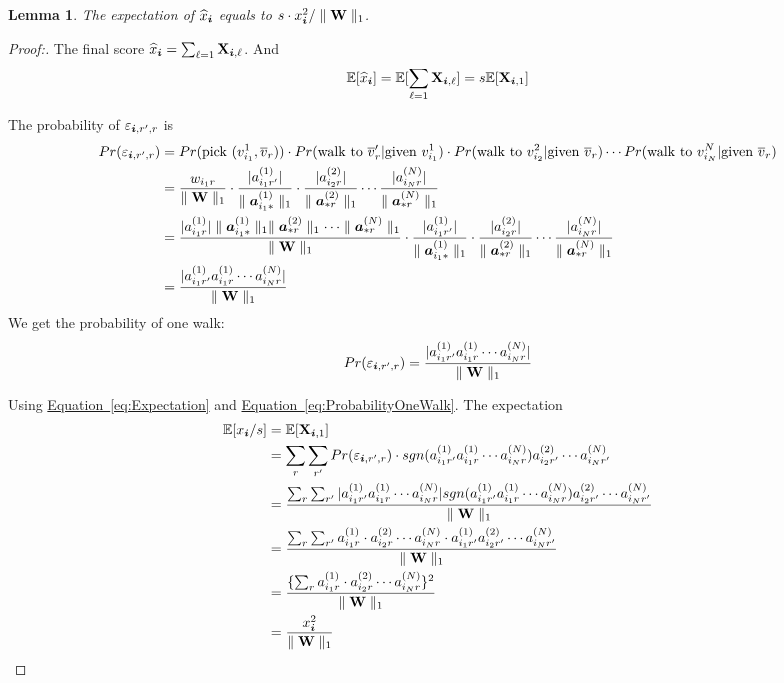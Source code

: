 \documentclass{article}
\newcommand{\Sca}[3]{{#1}^{(#2)}_{i_#2#3}}%
\newcommand{\V}[1]{{\bm{{\MakeLowercase{#1}}}}}%
\newcommand{\VnC}[3]{\V{#1}^{(#2)}_{#3}}%
\newcommand{\M}[1]{{\bm{\mathbf{\MakeUppercase{#1}}}}}%
\newcommand{\norm}[2]{\parallel#1\parallel_{#2}}
\newcommand{\Eqn}[1]{\hyperref[eq:#1]{{Equation~\ref*{eq:#1}}}}
\newtheorem{lemma}{Lemma}[section]
\begin{document}
\begin{lemma}\label{lemma:Expectation}
The expectation of $\widehat{x}_{\V{i}}$ equals to $s\cdot x^2_{\V{i}}/\norm{\M{W}}{1}$.
\end{lemma}
\begin{proof}[Proof:]
The final score $\widehat{x}_{\V{i}} = \sum_{\ell=1}\M{X}_{\V{i},\ell}$. And
\begin{equation}\label{eq:Expectation}
\mathbb{E}[\widehat{x}_{\V{i}}] = \mathbb{E}[\sum_{\ell=1}\M{X}_{\V{i},\ell}]=s\mathbb{E}[\M{X}_{\V{i},1}]
\end{equation}

The probability of $\varepsilon_{\V{i},r',r}$ is
\begin{align*}
Pr(\varepsilon_{\V{i},r',r})
& = Pr( {\rm pick\ } (v^1_{i_1},\overline{v}_r))\cdot
Pr( {\rm walk\ to\ } \overline{v}_r' | {\rm given\ }v^1_{i_1} )\cdot
Pr( {\rm walk\ to\ } v^2_{i_2} | {\rm given\ }\overline{v}_r) \cdots Pr( {\rm walk\ to\ } v^N_{i_N} | {\rm given\ }\overline{v}_r ) \\
&=\frac{w_{i_1r}}{\norm{\M{W}}{1}}\cdot
  \frac{|\Sca{a}{1}{r'}|}{\norm{{\VnC{a}{1}{i_1*}}}{1}}\cdot
  \frac{|\Sca{a}{2}{r}|}{\norm{{\VnC{a}{2}{*r}}}{1}}\cdots
  \frac{|\Sca{a}{N}{r}|}{\norm{{\VnC{a}{N}{*r}}}{1}}\\
&=\frac{    |\Sca{a}{1}{r}|\norm{{\VnC{a}{1}{i_1*}}}{1}\norm{{\VnC{a}{2}{*r}}}{1}\cdots\norm{{\VnC{a}{N}{*r}}}{1}   }{  \norm{\M{W}}{1}  }\cdot
  \frac{|\Sca{a}{1}{r'}|}{\norm{{\VnC{a}{1}{i_1*}}}{1}}\cdot
\frac{|\Sca{a}{2}{r}|}{\norm{{\VnC{a}{2}{*r}}}{1}}\cdots
  \frac{|\Sca{a}{N}{r}|}{\norm{{\VnC{a}{N}{*r}}}{1}}\\
&=\frac{    |\Sca{a}{1}{r'}\Sca{a}{1}{r}\cdots\Sca{a}{N}{r}|    }{\norm{\M{W}}{1}}
\end{align*}
We get the probability of one walk:
\begin{equation}\label{eq:ProbabilityOneWalk}
Pr(\varepsilon_{\V{i},r',r})=\frac{|\Sca{a}{1}{r'}\Sca{a}{1}{r}\cdots\Sca{a}{N}{r}|}{\norm{\M{W}}{1}}
\end{equation}

Using \Eqn{Expectation} and \Eqn{ProbabilityOneWalk}. The expectation
\begin{align*}
\mathbb{E}[x_{\V{i}}/s]
&= \mathbb{E}[\M{X}_{\V{i},1}]\\
&=\sum_{r}\sum_{r'}Pr(\varepsilon_{\V{i},r',r})\cdot sgn(\Sca{a}{1}{r'}\Sca{a}{1}{r}\cdots\Sca{a}{N}{r})
\Sca{a}{2}{r'}\cdots\Sca{a}{N}{r'}\\
&=\frac{\sum_{r}\sum_{r'}|\Sca{a}{1}{r'}\Sca{a}{1}{r}\cdots\Sca{a}{N}{r}|sgn(\Sca{a}{1}{r'}\Sca{a}{1}{r}\cdots\Sca{a}{N}{r})
\Sca{a}{2}{r'}\cdots\Sca{a}{N}{r'}}{\norm{\M{W}}{1}}\\
&=\frac{\sum_{r}\sum_{r'} \Sca{a}{1}{r}\cdot\Sca{a}{2}{r}\cdots\Sca{a}{N}{r}\cdot\Sca{a}{1}{r'} \Sca{a}{2}{r'}\cdots\Sca{a}{N}{r'}}{\norm{\M{W}}{1}} \\
&=\frac{\{\sum_{r}\Sca{a}{1}{r}\cdot\Sca{a}{2}{r}\cdots\Sca{a}{N}{r}\}^2}{\norm{\M{W}}{1}}\\
&=\frac{x_{\V{i}}^2}{\norm{\M{W}}{1}}
\end{align*}
\end{proof}
\end{document}
